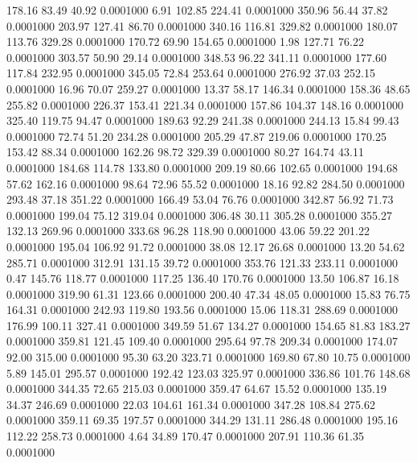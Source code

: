  178.16   83.49   40.92   0.0001000
   6.91  102.85  224.41   0.0001000
 350.96   56.44   37.82   0.0001000
 203.97  127.41   86.70   0.0001000
 340.16  116.81  329.82   0.0001000
 180.07  113.76  329.28   0.0001000
 170.72   69.90  154.65   0.0001000
   1.98  127.71   76.22   0.0001000
 303.57   50.90   29.14   0.0001000
 348.53   96.22  341.11   0.0001000
 177.60  117.84  232.95   0.0001000
 345.05   72.84  253.64   0.0001000
 276.92   37.03  252.15   0.0001000
  16.96   70.07  259.27   0.0001000
  13.37   58.17  146.34   0.0001000
 158.36   48.65  255.82   0.0001000
 226.37  153.41  221.34   0.0001000
 157.86  104.37  148.16   0.0001000
 325.40  119.75   94.47   0.0001000
 189.63   92.29  241.38   0.0001000
 244.13   15.84   99.43   0.0001000
  72.74   51.20  234.28   0.0001000
 205.29   47.87  219.06   0.0001000
 170.25  153.42   88.34   0.0001000
 162.26   98.72  329.39   0.0001000
  80.27  164.74   43.11   0.0001000
 184.68  114.78  133.80   0.0001000
 209.19   80.66  102.65   0.0001000
 194.68   57.62  162.16   0.0001000
  98.64   72.96   55.52   0.0001000
  18.16   92.82  284.50   0.0001000
 293.48   37.18  351.22   0.0001000
 166.49   53.04   76.76   0.0001000
 342.87   56.92   71.73   0.0001000
 199.04   75.12  319.04   0.0001000
 306.48   30.11  305.28   0.0001000
 355.27  132.13  269.96   0.0001000
 333.68   96.28  118.90   0.0001000
  43.06   59.22  201.22   0.0001000
 195.04  106.92   91.72   0.0001000
  38.08   12.17   26.68   0.0001000
  13.20   54.62  285.71   0.0001000
 312.91  131.15   39.72   0.0001000
 353.76  121.33  233.11   0.0001000
   0.47  145.76  118.77   0.0001000
 117.25  136.40  170.76   0.0001000
  13.50  106.87   16.18   0.0001000
 319.90   61.31  123.66   0.0001000
 200.40   47.34   48.05   0.0001000
  15.83   76.75  164.31   0.0001000
 242.93  119.80  193.56   0.0001000
  15.06  118.31  288.69   0.0001000
 176.99  100.11  327.41   0.0001000
 349.59   51.67  134.27   0.0001000
 154.65   81.83  183.27   0.0001000
 359.81  121.45  109.40   0.0001000
 295.64   97.78  209.34   0.0001000
 174.07   92.00  315.00   0.0001000
  95.30   63.20  323.71   0.0001000
 169.80   67.80   10.75   0.0001000
   5.89  145.01  295.57   0.0001000
 192.42  123.03  325.97   0.0001000
 336.86  101.76  148.68   0.0001000
 344.35   72.65  215.03   0.0001000
 359.47   64.67   15.52   0.0001000
 135.19   34.37  246.69   0.0001000
  22.03  104.61  161.34   0.0001000
 347.28  108.84  275.62   0.0001000
 359.11   69.35  197.57   0.0001000
 344.29  131.11  286.48   0.0001000
 195.16  112.22  258.73   0.0001000
   4.64   34.89  170.47   0.0001000
 207.91  110.36   61.35   0.0001000
